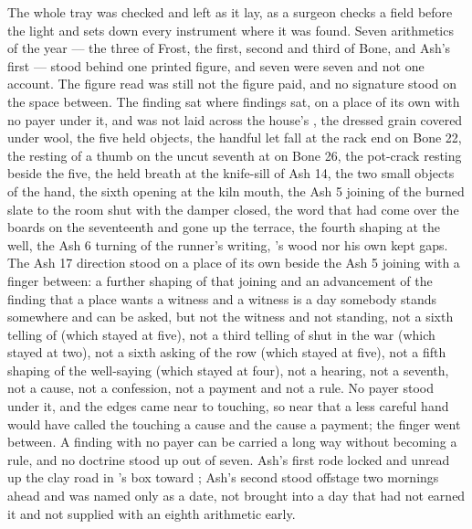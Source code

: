 The whole tray was checked and left as it lay, as a surgeon checks a field before the light and sets down every instrument where it was found. Seven arithmetics of the year --- the three of Frost, the first, second and third of Bone, and Ash's first --- stood behind one printed figure, and seven were seven and not one account. The figure read was still not the figure paid, and no signature stood on the space between. The finding sat where findings sat, on a place of its own with no payer under it, and was not laid across the house's , the dressed grain covered under wool, the five held objects, the handful let fall at the rack end on Bone 22, the resting of a thumb on the uncut seventh at  on Bone 26, the pot-crack resting beside the five, the held breath at the knife-sill of Ash 14, the two small objects of the hand, the sixth opening at the kiln mouth, the Ash 5 joining of the burned slate to the room shut with the damper closed, the word that had come over the boards on the seventeenth and gone up the terrace, the fourth shaping at the well, the Ash 6 turning of the runner's writing, 's wood nor his own kept gaps. The Ash 17 direction stood on a place of its own beside the Ash 5 joining with a finger between: a further shaping of that joining and an advancement of the finding that a place wants a witness and a witness is a day somebody stands somewhere and can be asked, but not the witness and not standing, not a sixth telling of  (which stayed at five), not a third telling of  shut in the war (which stayed at two), not a sixth asking of the row (which stayed at five), not a fifth shaping of the well-saying (which stayed at four), not a hearing, not a seventh, not a cause, not a confession, not a payment and not a rule. No payer stood under it, and the edges came near to touching, so near that a less careful hand would have called the touching a cause and the cause a payment; the finger went between. A finding with no payer can be carried a long way without becoming a rule, and no doctrine stood up out of seven. Ash's first rode locked and unread up the clay road in 's box toward ; Ash's second stood offstage two mornings ahead and was named only as a date, not brought into a day that had not earned it and not supplied with an eighth arithmetic early.

